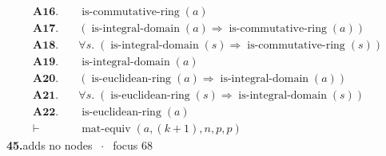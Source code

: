 \documentclass[11pt]{article}
\theoremstyle{plain}
\newcommand{\fit}[1]{\resizebox{\ifdim\width>\linewidth\linewidth\else\width\fi}{!}{#1}}
\begin{document}
\begin{align*}
  \mathbf{A16.}\quad & \operatorname{is\text{-}commutative\text{-}ring}(a) \\
  \mathbf{A17.}\quad & (\operatorname{is\text{-}integral\text{-}domain}(a) \Rightarrow \operatorname{is\text{-}commutative\text{-}ring}(a)) \\
  \mathbf{A18.}\quad & \forall s.\; (\operatorname{is\text{-}integral\text{-}domain}(s) \Rightarrow \operatorname{is\text{-}commutative\text{-}ring}(s)) \\
  \mathbf{A19.}\quad & \operatorname{is\text{-}integral\text{-}domain}(a) \\
  \mathbf{A20.}\quad & (\operatorname{is\text{-}euclidean\text{-}ring}(a) \Rightarrow \operatorname{is\text{-}integral\text{-}domain}(a)) \\
  \mathbf{A21.}\quad & \forall s.\; (\operatorname{is\text{-}euclidean\text{-}ring}(s) \Rightarrow \operatorname{is\text{-}integral\text{-}domain}(s)) \\
  \mathbf{A22.}\quad & \operatorname{is\text{-}euclidean\text{-}ring}(a) \\
  \vdash\quad & \operatorname{mat\text{-}equiv}(a, (k + 1), n, p, p)
\end{align*}
\medskip\noindent\textbf{45.}\quad \fit{\texttt{(ass)}}\hfill{\small adds no nodes $\;\cdot\;$ focus 68}\\[2pt]
\end{document}
